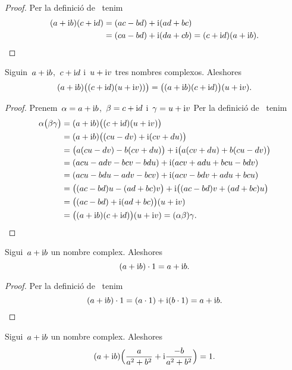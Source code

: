 \documentclass[../Apunts.tex]{subfiles}
\begin{document}
	\begin{proof}
		Per la definició de~ tenim
		\begin{align*}
			(a+\mathrm{i} b)(c+\mathrm{i} d)&=(ac-bd)+\mathrm{i}(ad+bc) \\
			&=(ca-bd)+\mathrm{i}(da+cb)=(c+\mathrm{i} d)(a+\mathrm{i} b).\qedhere
		\end{align*}
	\end{proof}
	\begin{proposition}
		\label{prop:els nombres complexos són associatius pel producte}
		Siguin~\(a+\mathrm{i} b\),~\(c+\mathrm{i} d\) i~\(u+\mathrm{i} v\) tres nombres complexos.
		Aleshores
		\[
			(a+\mathrm{i} b)\big((c+\mathrm{i} d)(u+\mathrm{i} v))\big) =
			\big((a+\mathrm{i} b)(c+\mathrm{i} d)\big)(u+\mathrm{i} v).
		\]
	\end{proposition}
	\begin{proof}
		Prenem~\(\alpha=a+\mathrm{i} b\),~\(\beta=c+\mathrm{i} d\) i~\(\gamma=u+\mathrm{i} v\)
		Per la definició de~ tenim
		\begin{align*}
			\alpha\big(\beta\gamma\big)
			&=(a+\mathrm{i} b)\big((c+\mathrm{i} d)(u+\mathrm{i} v)\big) \\
			&=(a+\mathrm{i} b)\big((cu-dv)+\mathrm{i}(cv+du)\big) \\
			&=\big(a(cu-dv)-b(cv+du)\big)+\mathrm{i}\big(a(cv+du)+b(cu-dv)\big) \\
			&=(acu-adv-bcv-bdu)+\mathrm{i}(acv+adu+bcu-bdv) \\
			&=(acu-bdu-adv-bcv)+\mathrm{i}(acv-bdv+adu+bcu) \\
			&=\big((ac-bd)u-(ad+bc)v\big)+\mathrm{i}\big((ac-bd)v+(ad+bc)u\big) \\
			&=\big((ac-bd)+\mathrm{i}(ad+bc)\big)(u+\mathrm{i} v) \\
			&=\big((a+\mathrm{i} b)(c+\mathrm{i} d)\big)(u+\mathrm{i} v)=(\alpha\beta)\gamma.
			\qedhere
		\end{align*}
	\end{proof}
	\begin{proposition}
		\label{prop:element neutre pel producte dels complexos}
		Sigui~\(a+\mathrm{i} b\) un nombre complex.
		Aleshores
		\[(a+\mathrm{i} b)\cdot1=a+\mathrm{i} b.\]
	\end{proposition}
	\begin{proof}
		Per la definició de~ tenim
		\[(a+\mathrm{i} b)\cdot1=(a\cdot1)+\mathrm{i}(b\cdot1)=a+\mathrm{i} b.\qedhere\]
	\end{proof}
	\begin{proposition}
		\label{prop:element invers pel producte de nombres complexos}
		Sigui~\(a+\mathrm{i} b\) un nombre complex.
		Aleshores
		\[
			(a+\mathrm{i} b)\Big(\frac{a}{a^{2}+b^{2}}+\mathrm{i}\frac{-b}{a^{2}+b^{2}}\Big)
			=1.
		\]
	\end{proposition}
\end{document}
